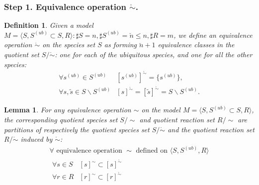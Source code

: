 \documentclass[9pt]{article}
\newcounter{lm}
\newcounter{def}
\newcounter{rm}
\begin{document}
\subsubsection*{Step 1. Equivalence operation $\mathring{\sim}$.}
\newtheorem{eq0}[def]{Definition}\label{equiv0}
\begin{eq0}
Given a model $M=\langle S, S^{(ub)}\subset{S}, R \rangle : \sharp S = n, \sharp S^{(ub)}=\breve{n} \leq n, \sharp R = m$, we define an \emph{equivalence operation $\mathring{\sim}$} on the species set $S$ as forming $\breve{n} + 1$ equivalence classes in the quotient set $S/\mathring{\sim}$: one for each of the ubiquitous species, and one for all the other species:
\[ \begin{array}{cl}
\mbox{$\forall s^{(ub)} \in S^{(ub)}$} & \mbox{$[s^{(ub)}]^{\mathring{\sim}} = \{s^{(ub)}\}$}, \\
\mbox{$\forall s, \tilde{s} \in S\backslash S^{(ub)}$} & \mbox{$[s]^{\mathring{\sim} } = [\tilde{s}]^{\mathring{\sim} } = S \backslash S^{(ub)}$}. 
\end{array} \]

\end{eq0}
\newtheorem{l1}[lm]{Lemma}
\begin{l1}
For any equivalence operation $\sim$ on the model $M=\langle S, S^{(ub)} \subset S, R \rangle$, the corresponding quotient species set $S/\sim$ and quotient reaction set $R/\sim$ are partitions of respectively the quotient species set $S/\mathring{\sim}$ and the quotient reaction set $R/\mathring{\sim} $ induced by $\mathring{\sim}$:
\[ \begin{array}{c}
\mbox{$\forall $ equivalence operation $\sim$ defined on $\langle S, S^{(ub)}, R \rangle$} \\
\begin{array}{cl}
\mbox{$\forall s \in S$} & \mbox{$[s]^{\sim} \subset [s]^{\mathring{\sim}}$} \\
\mbox{$\forall r \in R$} & \mbox{$[r]^{\sim} \subset [r]^{\mathring{\sim}} $}
\end{array}
\end{array} \]

\end{l1}
\end{document}
